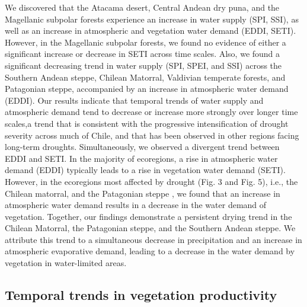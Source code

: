 \documentclass[
  sn-nature,
  numbered]{sn-jnl}
\begin{document}
We discovered that the Atacama desert, Central Andean dry puna, and the
Magellanic subpolar forests experience an increase in water supply (SPI,
SSI), as well as an increase in atmospheric and vegetation water demand
(EDDI, SETI). However, in the Magellanic subpolar forests, we found no
evidence of either a significant increase or decrease in SETI across
time scales. Also, we found a significant decreasing trend in water
supply (SPI, SPEI, and SSI) across the Southern Andean steppe, Chilean
Matorral\citep{Boisier2018, Sarricolea2019}, Valdivian temperate
forests, and Patagonian steppe, accompanied by an increase in
atmospheric water demand (EDDI). Our results indicate that temporal
trends of water supply and atmospheric demand tend to decrease or
increase more strongly over longer time scales,a trend that is
consistent with the progressive intensification of drought severity
across much of Chile, and that has been observed in other regions facing
long-term droughts\citep{Rashid2019, Miro2023}. Simultaneously, we
observed a divergent trend between EDDI and SETI. In the majority of
ecoregions, a rise in atmospheric water demand (EDDI) typically leads to
a rise in vegetation water demand (SETI). However, in the ecoregions
most affected by drought (Fig. 3 and Fig. 5), i.e., the Chilean
matorral, and the Patagonian steppe , we found that an increase in
atmospheric water demand results in a decrease in the water demand of
vegetation. Together, our findings demonstrate a persistent drying trend
in the Chilean Matorral, the Patagonian steppe, and the Southern Andean
steppe. We attribute this trend to a simultaneous decrease in
precipitation and an increase in atmospheric evaporative demand, leading
to a decrease in the water demand by vegetation in water-limited
areas\citep{Pascoa2021}.

\subsection{Temporal trends in vegetation
productivity}\label{temporal-trends-in-vegetation-productivity}
\end{document}
